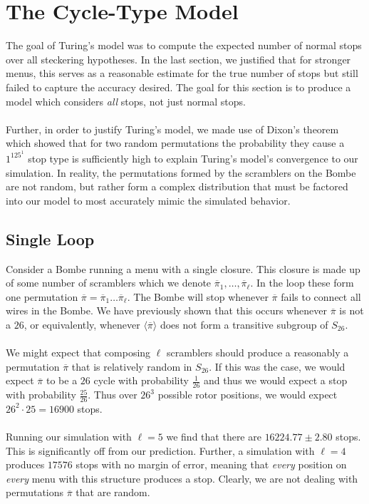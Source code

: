 \section{The Cycle-Type Model}
The goal of Turing's model was to compute the expected number of normal stops over all steckering hypotheses. In the last section, we justified that for stronger menus, this serves as a reasonable estimate for the true number of stops but still failed to capture the accuracy desired. The goal for this section is to produce a model which considers \emph{all} stops, not just normal stops.
\\\\Further, in order to justify Turing's model, we made use of Dixon's theorem which showed that for two random permutations the probability they cause a $1^125^1$ stop type is sufficiently high to explain Turing's model's convergence to our simulation. In reality, the permutations formed by the scramblers on the Bombe are not random, but rather form a complex distribution that must be factored into our model to most accurately mimic the simulated behavior.
\subsection{Single Loop} Consider a Bombe running a menu with a single closure. This closure is made up of some number of scramblers which we denote $\overline\pi_1, \dots, \overline\pi_\ell$. In the loop these form one permutation $\overline\pi = \overline\pi_1\dots\overline\pi_\ell$. The Bombe will stop whenever $\overline\pi$ fails to connect all wires in the Bombe. We have previously shown that this occurs whenever $\overline\pi$ is not a $26$, or equivalently, whenever $\langle\overline\pi\rangle$ does not form a transitive subgroup of $S_{26}$.
\\\\We might expect that composing $\ell$ scramblers should produce a reasonably a permutation $\overline\pi$ that is relatively random in $S_{26}$. If this was the case, we would expect $\overline\pi$ to be a $26$ cycle with probability $\frac{1}{26}$ and thus we would expect a stop with probability $\frac{25}{26}$. Thus over $26^3$ possible rotor positions, we would expect $26^2\cdot25 = 16900$ stops.
\\\\Running our simulation with $\ell = 5$ we find that there are $16224.77\pm2.80$ stops. This is significantly off from our prediction. Further, a simulation with $\ell=4$ produces $17576$ stops with no margin of error, meaning that \emph{every} position on \emph{every} menu with this structure produces a stop. Clearly, we are not dealing with permutations $\overline\pi$ that are random.

